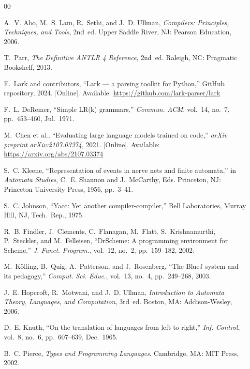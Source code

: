 \documentclass[conference]{IEEEtran}
\begin{document}
\begin{thebibliography}{00}

A.~V. Aho, M.~S. Lam, R.~Sethi, and J.~D. Ullman,
\textit{Compilers: Principles, Techniques, and Tools}, 2nd~ed.
Upper Saddle River, NJ: Pearson Education, 2006.

T.~Parr,
\textit{The Definitive ANTLR 4 Reference}, 2nd~ed.
Raleigh, NC: Pragmatic Bookshelf, 2013.

E.~Lark and contributors,
``Lark --- a parsing toolkit for Python,''
GitHub repository, 2024.
[Online]. Available: \url{https://github.com/lark-parser/lark}

F.~L. DeRemer,
``Simple LR(k) grammars,''
\textit{Commun. ACM}, vol.~14, no.~7, pp.~453--460, Jul.~1971.

M.~Chen et al.,
``Evaluating large language models trained on code,''
\textit{arXiv preprint arXiv:2107.03374}, 2021.
[Online]. Available: \url{https://arxiv.org/abs/2107.03374}

S.~C. Kleene,
``Representation of events in nerve nets and finite automata,''
in \textit{Automata Studies}, C.~E. Shannon and J.~McCarthy, Eds.
Princeton, NJ: Princeton University Press, 1956, pp.~3--41.

S.~C. Johnson,
``Yacc: Yet another compiler-compiler,''
Bell Laboratories, Murray Hill, NJ, Tech.\ Rep., 1975.

R.~B. Findler, J.~Clements, C.~Flanagan, M.~Flatt, S.~Krishnamurthi,
P.~Steckler, and M.~Felleisen,
``DrScheme: A programming environment for Scheme,''
\textit{J. Funct. Program.}, vol.~12, no.~2, pp.~159--182, 2002.

M.~K{\"o}lling, B.~Quig, A.~Patterson, and J.~Rosenberg,
``The BlueJ system and its pedagogy,''
\textit{Comput. Sci. Educ.}, vol.~13, no.~4, pp.~249--268, 2003.

J.~E. Hopcroft, R.~Motwani, and J.~D. Ullman,
\textit{Introduction to Automata Theory, Languages, and Computation}, 3rd~ed.
Boston, MA: Addison-Wesley, 2006.

D.~E. Knuth,
``On the translation of languages from left to right,''
\textit{Inf. Control}, vol.~8, no.~6, pp.~607--639, Dec.~1965.

B.~C. Pierce,
\textit{Types and Programming Languages}.
Cambridge, MA: MIT Press, 2002.


\end{thebibliography}
\end{document}
